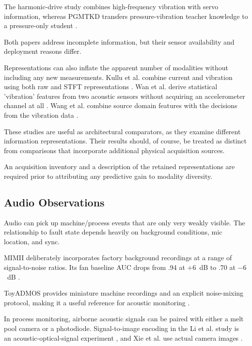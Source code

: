 The harmonic-drive study combines high-frequency vibration with servo information, whereas PGMTKD
transfers pressure-vibration teacher knowledge to a pressure-only student
\citep{Yang2024Fault,Li2025PGMTKD}.

Both papers address incomplete information, but their sensor availability and deployment reasons
differ.

Representations can also inflate the apparent number of modalities without including any new
measurements. Kullu et al. combine current and vibration using both raw and STFT representations
\citep{Kullu2022A}. Wan et al. derive statistical 'vibration' features from two acoustic sensors
without acquiring an accelerometer channel at all \citep{Wan2024Pipeline}. Wang et al. combine
source domain features with the decisions from the vibration data \citep{Wang2025A}.

These studies are useful as architectural comparators, as they examine different information
representations. Their results should, of course, be treated as distinct from comparisons that
incorporate additional physical acquisition sources.

An acquisition inventory and a description of the retained representations are required prior to
attributing any predictive gain to modality diversity.

\subsection{Audio Observations}

Audio can pick up machine/process events that are only very weakly visible. The relationship to
fault state depends heavily on background conditions, mic location, and sync.

MIMII deliberately incorporates factory background recordings at a range of signal-to-noise ratios.
Its fan baseline AUC drops from .94 at $+6$~dB to .70 at $-6$~dB \citep[Table~3]{Purohit2019MIMII}.

ToyADMOS provides miniature machine recordings and an explicit noise-mixing protocol, making it a
useful reference for acoustic monitoring \citep{Koizumi2019ToyADMOS}.

In process monitoring, airborne acoustic signals can be paired with either a melt pool camera or a
photodiode. Signal-to-image encoding in the Li et al. study is an acoustic-optical-signal experiment
\citep{Li2022A}, and Xie et al. use actual camera images \citep{Xie2025Audiovisual}.

